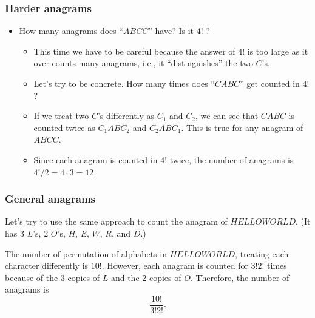 \begin{frame}\frametitle{Harder anagrams}
  \begin{itemize}
  \item How many anagrams does ``$ABCC$'' have? Is it $4!$ ? \pause
    \begin{itemize}
    \item This time we have to be careful because the answer of $4!$
      is too large as it over counts many anagrams, i.e., it
      ``distinguishes'' the two $C$'s. \pause
    \item Let's try to be concrete. How many times does ``$CABC$'' get
      counted in $4!$? \pause
    \item If we treat two $C$'s differently as $C_1$ and $C_2$, we can
      see that $CABC$ is counted twice as $C_1ABC_2$ and $C_2ABC_1$.
      This is true for any anagram of $ABCC$.  \pause
    \item Since each anagram is counted in $4!$ twice, the number of
      anagrams is $4! / 2 = 4\cdot 3 = 12$.
    \end{itemize}
  \end{itemize}
\end{frame}

\begin{frame}\frametitle{General anagrams}
  \begin{tcolorbox}
    Let's try to use the same approach to count the anagram of
    $HELLOWORLD$. (It has 3 $L$'s, 2 $O$'s, $H$, $E$, $W$, $R$, and
    $D$.)
  \end{tcolorbox}
  
  \pause
  \vspace{0.2in}
  
  The number of permutation of alphabets in $HELLOWORLD$, treating
  each character differently is $10!$.  However, each anagram is
  counted for $3!2!$ times because of the 3 copies of $L$ and the 2
  copies of $O$.  Therefore, the number of anagrams is
  \[
  \frac{10!}{3!2!}.
  \]
\end{frame}

